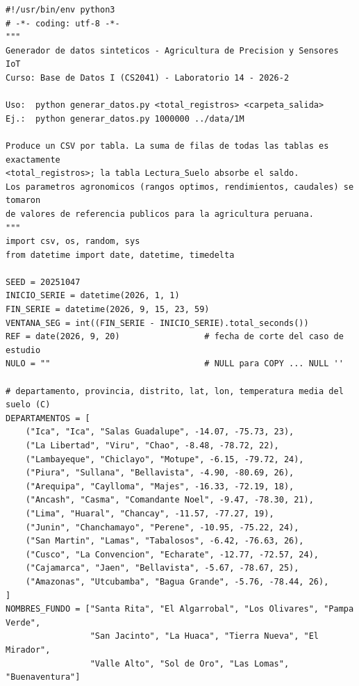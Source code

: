 \documentclass[11pt,letterpaper]{article}
\begin{document}
\begin{lstlisting}[style=py]
#!/usr/bin/env python3
# -*- coding: utf-8 -*-
"""
Generador de datos sinteticos - Agricultura de Precision y Sensores IoT
Curso: Base de Datos I (CS2041) - Laboratorio 14 - 2026-2

Uso:  python generar_datos.py <total_registros> <carpeta_salida>
Ej.:  python generar_datos.py 1000000 ../data/1M

Produce un CSV por tabla. La suma de filas de todas las tablas es exactamente
<total_registros>; la tabla Lectura_Suelo absorbe el saldo.
Los parametros agronomicos (rangos optimos, rendimientos, caudales) se tomaron
de valores de referencia publicos para la agricultura peruana.
"""
import csv, os, random, sys
from datetime import date, datetime, timedelta

SEED = 20251047
INICIO_SERIE = datetime(2026, 1, 1)
FIN_SERIE = datetime(2026, 9, 15, 23, 59)
VENTANA_SEG = int((FIN_SERIE - INICIO_SERIE).total_seconds())
REF = date(2026, 9, 20)                 # fecha de corte del caso de estudio
NULO = ""                               # NULL para COPY ... NULL ''

# departamento, provincia, distrito, lat, lon, temperatura media del suelo (C)
DEPARTAMENTOS = [
    ("Ica", "Ica", "Salas Guadalupe", -14.07, -75.73, 23),
    ("La Libertad", "Viru", "Chao", -8.48, -78.72, 22),
    ("Lambayeque", "Chiclayo", "Motupe", -6.15, -79.72, 24),
    ("Piura", "Sullana", "Bellavista", -4.90, -80.69, 26),
    ("Arequipa", "Caylloma", "Majes", -16.33, -72.19, 18),
    ("Ancash", "Casma", "Comandante Noel", -9.47, -78.30, 21),
    ("Lima", "Huaral", "Chancay", -11.57, -77.27, 19),
    ("Junin", "Chanchamayo", "Perene", -10.95, -75.22, 24),
    ("San Martin", "Lamas", "Tabalosos", -6.42, -76.63, 26),
    ("Cusco", "La Convencion", "Echarate", -12.77, -72.57, 24),
    ("Cajamarca", "Jaen", "Bellavista", -5.67, -78.67, 25),
    ("Amazonas", "Utcubamba", "Bagua Grande", -5.76, -78.44, 26),
]
NOMBRES_FUNDO = ["Santa Rita", "El Algarrobal", "Los Olivares", "Pampa Verde",
                 "San Jacinto", "La Huaca", "Tierra Nueva", "El Mirador",
                 "Valle Alto", "Sol de Oro", "Las Lomas", "Buenaventura"]


\end{lstlisting}
\end{document}
